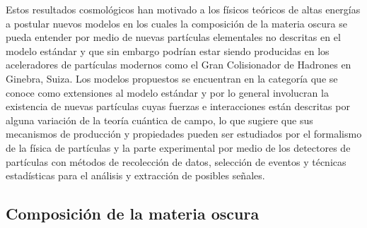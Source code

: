 %

Estos resultados cosmológicos han motivado a los físicos teóricos de altas energías a postular nuevos modelos en los cuales la composición de la materia oscura se pueda entender por medio de nuevas partículas elementales no descritas en el modelo estándar y que sin embargo podrían estar siendo producidas en los aceleradores de partículas modernos como el Gran Colisionador de Hadrones en Ginebra, Suiza. Los modelos propuestos se encuentran en la categoría que se conoce como extensiones al modelo estándar y por lo general involucran la existencia de nuevas partículas cuyas fuerzas e interacciones están descritas por alguna variación de la teoría cuántica de campo, lo que sugiere que sus mecanismos de producción y propiedades pueden ser estudiados por el formalismo de la física de partículas y la parte experimental por medio de los detectores de partículas con métodos de recolección de datos, selección de eventos y técnicas estadísticas para el análisis y extracción de posibles señales.




\subsection{Composición de la materia oscura}

